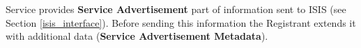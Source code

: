 \documentclass{book}
\begin{document}
Service provides \textbf{Service Advertisement} part of information sent to ISIS (see Section \ref{isis_interface}).
Before sending this information the Registrant extends it with additional data (\textbf{Service Advertisement Metadata}).



% 
\end{document}
